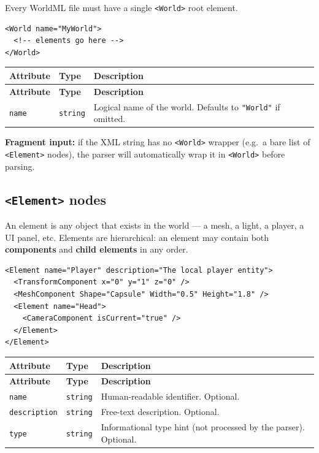 \documentclass[11pt,a4paper]{article}
\begin{document}
Every WorldML file must have a single \texttt{<World>} root element.

\begin{lstlisting}
<World name="MyWorld">
  <!-- elements go here -->
</World>
\end{lstlisting}

\begin{longtable}{P{3cm} P{2.5cm} P{7.5cm}}
  \toprule
  \textbf{Attribute} & \textbf{Type} & \textbf{Description} \\
  \midrule
  \endfirsthead
  \toprule
  \textbf{Attribute} & \textbf{Type} & \textbf{Description} \\
  \midrule
  \endhead
  \texttt{name} & \texttt{string} & Logical name of the world. Defaults to
    \texttt{"World"} if omitted. \\
  \bottomrule
\end{longtable}

\begin{notebox}
  \textbf{Fragment input:} if the XML string has no \texttt{<World>} wrapper
  (e.g.\ a bare list of \texttt{<Element>} nodes), the parser will
  automatically wrap it in \texttt{<World>} before parsing.
\end{notebox}

\subsection{\texttt{<Element>} nodes}

An element is any object that exists in the world --- a mesh, a light, a
player, a UI panel, etc.  Elements are hierarchical: an element may contain
both \textbf{components} and \textbf{child elements} in any order.

\begin{lstlisting}
<Element name="Player" description="The local player entity">
  <TransformComponent x="0" y="1" z="0" />
  <MeshComponent Shape="Capsule" Width="0.5" Height="1.8" />
  <Element name="Head">
    <CameraComponent isCurrent="true" />
  </Element>
</Element>
\end{lstlisting}

\begin{longtable}{P{3cm} P{2.5cm} P{7.5cm}}
  \toprule
  \textbf{Attribute} & \textbf{Type} & \textbf{Description} \\
  \midrule
  \endfirsthead
  \toprule
  \textbf{Attribute} & \textbf{Type} & \textbf{Description} \\
  \midrule
  \endhead
  \texttt{name} & \texttt{string} & Human-readable identifier. Optional. \\
  \texttt{description} & \texttt{string} & Free-text description. Optional. \\
  \texttt{type} & \texttt{string} & Informational type hint (not processed by
    the parser). Optional. \\
  \bottomrule
\end{longtable}
\end{document}
